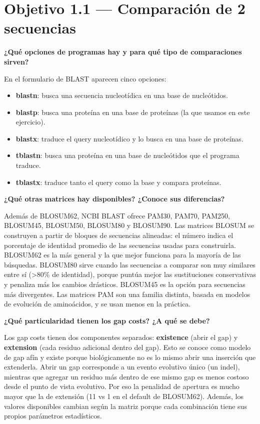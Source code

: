 \section{Objetivo 1.1 — Comparación de 2 secuencias}

\textbf{¿Qué opciones de programas hay y para qué tipo de comparaciones sirven?}

En el formulario de BLAST aparecen cinco opciones:

\begin{itemize}
  \item \textbf{blastn}: busca una secuencia nucleotídica en una base de nucleótidos.
  \item \textbf{blastp}: busca una proteína en una base de proteínas (la que usamos en este ejercicio).
  \item \textbf{blastx}: traduce el query nucleotídico y lo busca en una base de proteínas.
  \item \textbf{tblastn}: busca una proteína en una base de nucleótidos que el programa traduce.
  \item \textbf{tblastx}: traduce tanto el query como la base y compara proteínas.
\end{itemize}

\textbf{¿Qué otras matrices hay disponibles? ¿Conoce sus diferencias?}

Además de BLOSUM62, NCBI BLAST ofrece PAM30, PAM70, PAM250, BLOSUM45, BLOSUM50, BLOSUM80 y BLOSUM90.
Las matrices BLOSUM se construyen a partir de bloques de secuencias alineadas: el número indica el porcentaje
de identidad promedio de las secuencias usadas para construirla. BLOSUM62 es la más general y la que mejor
funciona para la mayoría de las búsquedas. BLOSUM80 sirve cuando las secuencias a comparar son muy similares
entre sí (>80\% de identidad), porque puntúa mejor las sustituciones conservativas y penaliza más los cambios
drásticos. BLOSUM45 es la opción para secuencias más divergentes. Las matrices PAM son una familia distinta,
basada en modelos de evolución de aminoácidos, y se usan menos en la práctica.

\textbf{¿Qué particularidad tienen los gap costs? ¿A qué se debe?}

Los gap costs tienen dos componentes separados: \textbf{existence} (abrir el gap) y \textbf{extension}
(cada residuo adicional dentro del gap). Esto se conoce como modelo de gap afín y existe porque biológicamente
no es lo mismo abrir una inserción que extenderla. Abrir un gap corresponde a un evento evolutivo único
(un indel), mientras que agregar un residuo más dentro de ese mismo gap es menos costoso desde el punto de
vista evolutivo. Por eso la penalidad de apertura es mucho mayor que la de extensión (11 vs 1 en el default
de BLOSUM62). Además, los valores disponibles cambian según la matriz porque cada combinación tiene sus
propios parámetros estadísticos.

